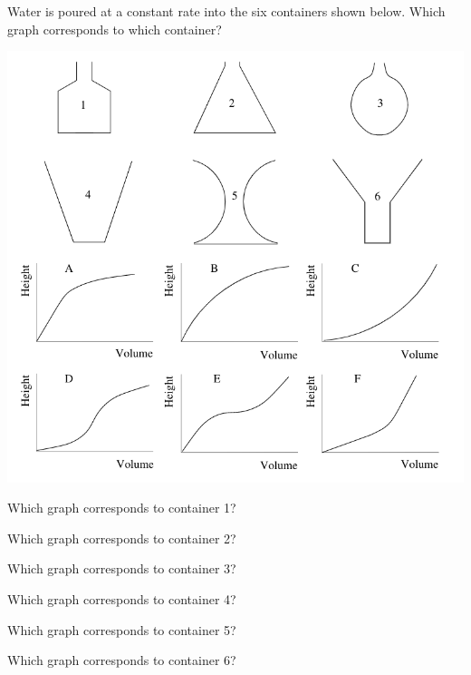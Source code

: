 \documentclass{ximera}
\author{Vic Ferdinand, Betsy McNeal, Jenny Sheldon}
\begin{document}
\begin{exercise}
Water is poured at a constant rate into the six containers shown
below. Which graph corresponds to which container?


\begin{image}
\includegraphics[width=\textwidth]{GraphicDetails3.png}
\end{image}


Which graph corresponds to container 1?
\begin{multipleChoice}
\end{multipleChoice}


Which graph corresponds to container 2?
\begin{multipleChoice}
\end{multipleChoice}


Which graph corresponds to container 3?
\begin{multipleChoice}
\end{multipleChoice}


Which graph corresponds to container 4?
\begin{multipleChoice}
\end{multipleChoice}


Which graph corresponds to container 5?
\begin{multipleChoice}
\end{multipleChoice}


Which graph corresponds to container 6?
\begin{multipleChoice}
\end{multipleChoice}

\end{exercise}
\end{document}
